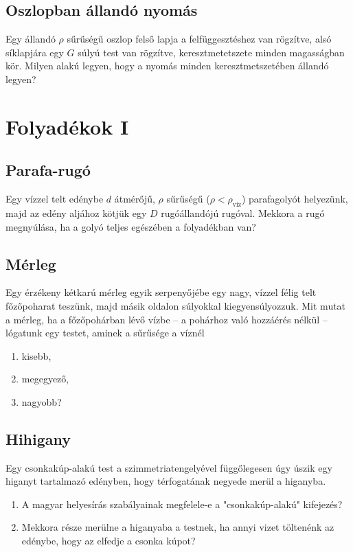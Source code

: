 \documentclass[12pt,a4paper]{scrartcl}
\begin{document}
\subsection{Oszlopban állandó nyomás}
Egy állandó $\rho$ sűrűségű oszlop felső lapja a felfüggesztéshez van rögzítve, alsó síklapjára egy $G$ súlyú test van rögzítve, keresztmetetszete minden magasságban kör. Milyen alakú legyen, hogy a nyomás minden keresztmetszetében állandó legyen?

\section{Folyadékok I}
\subsection{Parafa-rugó}
Egy vízzel telt edénybe $d$ átmérőjű, $\rho$ sűrűségű ($\rho<\rho_{\text{víz}}$) parafagolyót helyezünk, majd az edény aljához kötjük egy $D$ rugóállandójú rugóval. Mekkora a rugó megnyúlása, ha a golyó teljes egészében a folyadékban van?

\subsection{Mérleg}
Egy érzékeny kétkarú mérleg egyik serpenyőjébe egy nagy, vízzel félig telt főzőpoharat teszünk, majd másik oldalon súlyokkal kiegyensúlyozzuk. Mit mutat a mérleg, ha a főzőpohárban lévő vízbe -- a pohárhoz való hozzáérés nélkül -- lógatunk egy testet, aminek a sűrűsége a víznél
\begin{enumerate}
\item kisebb,
\item megegyező,
\item nagyobb?
\end{enumerate}

\subsection{Hihigany}
Egy csonkakúp-alakú test a szimmetriatengelyével függőlegesen úgy úszik egy higanyt tartalmazó edényben, hogy térfogatának negyede merül a higanyba.
\begin{enumerate}
\item A magyar helyesírás szabályainak megfelele-e a "csonkakúp-alakú" kifejezés?
\item Mekkora része merülne a higanyaba a testnek, ha annyi vizet töltenénk az  edénybe, hogy az elfedje a csonka kúpot?
\end{enumerate}
\end{document}

